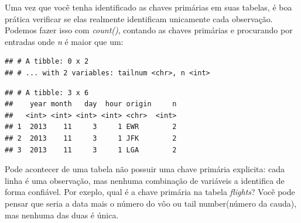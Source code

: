 \documentclass[
]{article}
\newenvironment{Shaded}{\begin{snugshade}}{\end{snugshade}}
\newcommand{\DecValTok}[1]{\textcolor[rgb]{0.00,0.00,0.81}{#1}}
\newcommand{\KeywordTok}[1]{\textcolor[rgb]{0.13,0.29,0.53}{\textbf{#1}}}
\newcommand{\NormalTok}[1]{#1}
\newcommand{\OperatorTok}[1]{\textcolor[rgb]{0.81,0.36,0.00}{\textbf{#1}}}
\newcommand{\StringTok}[1]{\textcolor[rgb]{0.31,0.60,0.02}{#1}}
\begin{document}
Uma vez que você tenha identificado as chaves primárias em suas tabelas,
é boa prática verificar se elas realmente identificam unicamente cada
observação. Podemos fazer isso com \emph{count()}, contando as chaves
primárias e procurando por entradas onde \emph{n} é maior que um:

\begin{Shaded}
\end{Shaded}

\begin{verbatim}
## # A tibble: 0 x 2
## # ... with 2 variables: tailnum <chr>, n <int>
\end{verbatim}

\begin{Shaded}
\end{Shaded}

\begin{verbatim}
## # A tibble: 3 x 6
##    year month   day  hour origin     n
##   <int> <int> <int> <int> <chr>  <int>
## 1  2013    11     3     1 EWR        2
## 2  2013    11     3     1 JFK        2
## 3  2013    11     3     1 LGA        2
\end{verbatim}

Pode acontecer de uma tabela não possuir uma chave primária explicita:
cada linha é uma observação, mas nenhuma combinação de variáveis a
identifica de forma confiável. Por exeplo, qual é a chave primária na
tabela \emph{flights}? Você pode pensar que seria a data mais o número
do vôo ou tail number(número da cauda), mas nenhuma das duas é única.

\begin{Shaded}
\end{Shaded}
\end{document}
